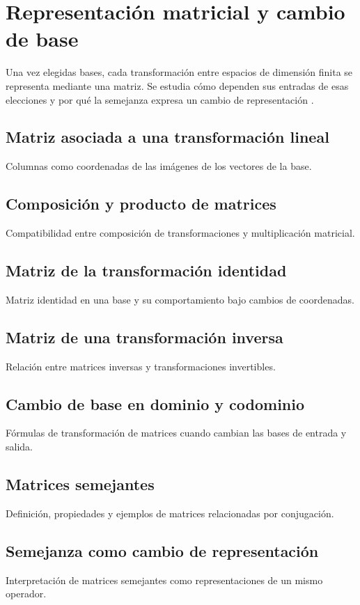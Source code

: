 \chapter{Representación matricial y cambio de base}
\label{cap:representacion-matricial}

Una vez elegidas bases, cada transformación entre espacios de dimensión finita se representa mediante una matriz. Se estudia cómo dependen sus entradas de esas elecciones y por qué la semejanza expresa un cambio de representación \cite{lang1987,hoffmankunze1971,axler2024}.

\section{Matriz asociada a una transformación lineal}
Columnas como coordenadas de las imágenes de los vectores de la base.

\section{Composición y producto de matrices}
Compatibilidad entre composición de transformaciones y multiplicación matricial.

\section{Matriz de la transformación identidad}
Matriz identidad en una base y su comportamiento bajo cambios de coordenadas.

\section{Matriz de una transformación inversa}
Relación entre matrices inversas y transformaciones invertibles.

\section{Cambio de base en dominio y codominio}
Fórmulas de transformación de matrices cuando cambian las bases de entrada y salida.

\section{Matrices semejantes}
Definición, propiedades y ejemplos de matrices relacionadas por conjugación.

\section{Semejanza como cambio de representación}
Interpretación de matrices semejantes como representaciones de un mismo operador.
